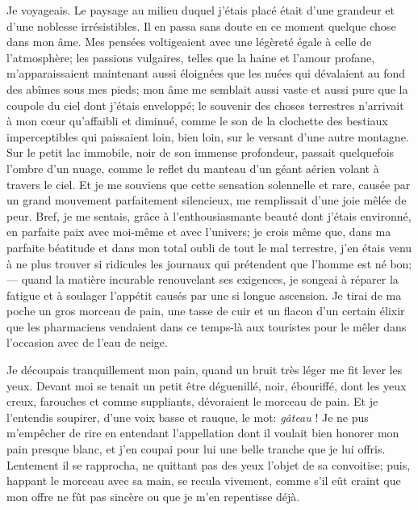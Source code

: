 Je voyageais. Le paysage au milieu duquel j’étais placé
était d’une grandeur et d’une
noblesse irrésistibles. Il en passa sans doute en ce moment quelque
chose dans mon âme. Mes pensées voltigeaient avec une légèreté égale à
celle de l’atmosphère; les passions vulgaires, telles
que la haine et l’amour profane,
m’apparaissaient maintenant aussi éloignées que les
nuées qui dévalaient au fond des abîmes sous mes pieds; mon âme me
semblait aussi vaste et aussi pure que la coupole du ciel dont
j’étais enveloppé; le souvenir des choses terrestres
n’arrivait à mon c\oe ur qu’affaibli et
diminué, comme le son de la clochette des bestiaux imperceptibles qui
paissaient loin, bien loin, sur le versant d’une autre
montagne. Sur le petit lac immobile, noir de son immense profondeur,
passait quelquefois l’ombre d’un
nuage, comme le reflet du manteau d’un géant aérien
volant à travers le ciel. Et je me souviens que cette sensation
solennelle et rare, causée par un grand mouvement parfaitement
silencieux, me remplissait d’une joie mêlée de peur.
Bref, je me sentais, grâce à l’enthousiasmante beauté
dont j’étais environné, en parfaite paix avec
moi{}-même et avec l’univers; je crois même que, dans
ma parfaite béatitude et dans mon total oubli de tout le mal terrestre,
j’en étais venu à ne plus trouver si ridicules les
journaux qui prétendent que l’homme est né bon; ---
quand la matière incurable renouvelant ses exigences, je songeai à
réparer la fatigue et à soulager l’appétit causés par
une si longue ascension. Je tirai de ma poche un gros morceau de pain,
une tasse de cuir et un flacon d’un certain élixir que
les pharmaciens vendaient dans ce temps{}-là aux touristes pour le
mêler dans l’occasion avec de l’eau
de neige.

Je découpais tranquillement mon pain, quand un bruit très léger me fit
lever les yeux. Devant moi se tenait un petit être déguenillé, noir,
ébouriffé, dont les yeux creux, farouches et comme suppliants,
dévoraient le morceau de pain. Et je l’entendis
soupirer, d’une voix basse et rauque, le mot: \textit{gâteau} !
Je ne pus m’empêcher de rire en entendant
l’appellation dont il voulait bien honorer mon pain
presque blanc, et j’en coupai pour lui une belle
tranche que je lui offris. Lentement il se rapprocha, ne quittant pas
des yeux l’objet de sa convoitise; puis, happant le
morceau avec sa main, se recula vivement, comme s’il
eût craint que mon offre ne fût pas sincère ou que je
m’en repentisse déjà.

